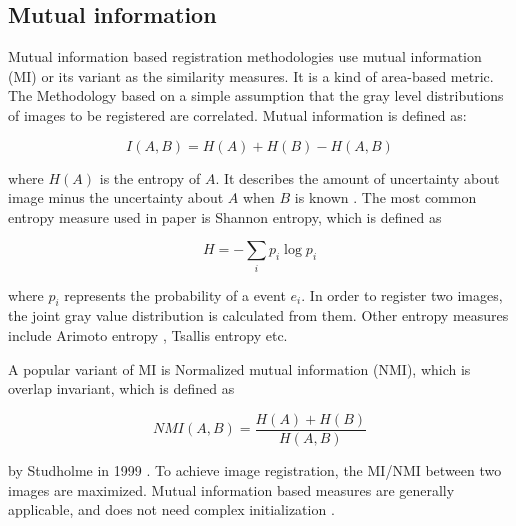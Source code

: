 \documentclass{IEEEtran}
\begin{document}
  \subsection{Mutual information}

  Mutual information based registration methodologies use mutual information (MI) or its variant as the similarity measures. It is a kind of area-based metric. The Methodology based on a simple assumption that the gray level distributions of images to be registered are correlated. Mutual information is defined as:

  \begin{equation}
    I(A, B) = H(A) + H(B) - H(A, B)
  \end{equation}

  where $H(A)$ is the entropy of $A$. It describes the amount of uncertainty about image minus the uncertainty about $A$ when $B$ is known \cite{pluim2003mutual}. The most common entropy measure used in paper is Shannon entropy, which is defined as

  \begin{equation}
    H = -\sum_i{p_i\log{p_i}}
  \end{equation}

  where $p_i$ represents the probability of a event $e_i$. In order to register two images, the joint gray value distribution is calculated from them. Other entropy measures include Arimoto entropy \cite{li20153d}, Tsallis entropy \cite{khader2012information} etc.

  A popular variant of MI is Normalized mutual information (NMI), which is overlap invariant, which is defined as

  \begin{equation}
    NMI(A, B) = \frac{H(A) + H(B)}{H(A, B)}
  \end{equation}

  by Studholme in 1999 \cite{studholme1999overlap}. To achieve image registration, the MI/NMI between two images are maximized. Mutual information based measures are generally applicable, and does not need complex initialization \cite{pluim2003mutual}.



\end{document}
